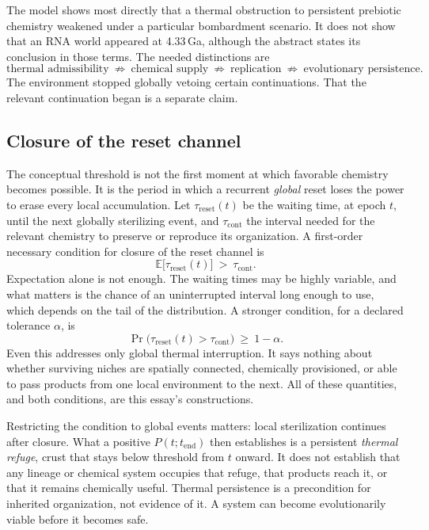 \documentclass[11pt]{article}
\theoremstyle{definition}
\begin{document}
The model shows most directly that a thermal obstruction to persistent prebiotic chemistry weakened under a particular bombardment scenario. It does not show that an RNA world appeared at 4.33\,Ga, although the abstract states its conclusion in those terms. The needed distinctions are
\begin{equation}
\text{thermal admissibility}\ \not\Rightarrow\ \text{chemical supply}\ \not\Rightarrow\ \text{replication}\ \not\Rightarrow\ \text{evolutionary persistence}.
\end{equation}
The environment stopped globally vetoing certain continuations. That the relevant continuation began is a separate claim.

\subsection{Closure of the reset channel}

The conceptual threshold is not the first moment at which favorable chemistry becomes possible. It is the period in which a recurrent \emph{global} reset loses the power to erase every local accumulation. Let $\tau_{\mathrm{reset}}(t)$ be the waiting time, at epoch $t$, until the next globally sterilizing event, and $\tau_{\mathrm{cont}}$ the interval needed for the relevant chemistry to preserve or reproduce its organization. A first-order necessary condition for closure of the reset channel is
\begin{equation}
\mathbb E\big[\tau_{\mathrm{reset}}(t)\big]\ >\ \tau_{\mathrm{cont}} .
\end{equation}
Expectation alone is not enough. The waiting times may be highly variable, and what matters is the chance of an uninterrupted interval long enough to use, which depends on the tail of the distribution. A stronger condition, for a declared tolerance $\alpha$, is
\begin{equation}
\Pr\big(\tau_{\mathrm{reset}}(t)>\tau_{\mathrm{cont}}\big)\ \ge\ 1-\alpha .
\end{equation}
Even this addresses only global thermal interruption. It says nothing about whether surviving niches are spatially connected, chemically provisioned, or able to pass products from one local environment to the next. All of these quantities, and both conditions, are this essay's constructions.

Restricting the condition to global events matters: local sterilization continues after closure. What a positive $P(t;t_{\mathrm{end}})$ then establishes is a persistent \emph{thermal refuge}, crust that stays below threshold from $t$ onward. It does not establish that any lineage or chemical system occupies that refuge, that products reach it, or that it remains chemically useful. Thermal persistence is a precondition for inherited organization, not evidence of it. A system can become evolutionarily viable before it becomes safe.
\end{document}
